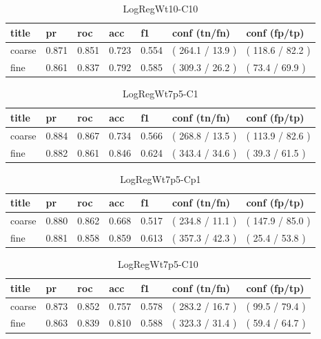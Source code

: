 \documentclass[ms]{nuthesis}
\begin{document}
\FloatBarrier
\begin{table}[H]
\centering
\begin{tabular}{|l||l||l||l||l||l||l|}\toprule
title & pr & roc & acc & f1 & conf (tn/fn) & conf (fp/tp) \\ \midrule
coarse & 0.871 & 0.851 & 0.723 & 0.554 & ( 264.1 / 13.9 ) & ( 118.6 / 82.2 ) \\
fine & 0.861 & 0.837 & 0.792 & 0.585 & ( 309.3 / 26.2 ) & ( 73.4 / 69.9 ) \\ \bottomrule
\end{tabular}
\caption{LogRegWt10-C10}
\label{tab:LogRegWt10-C10}
\end{table}
\FloatBarrier

\FloatBarrier
\begin{table}[H]
\centering
\begin{tabular}{|l||l||l||l||l||l||l|}\toprule
title & pr & roc & acc & f1 & conf (tn/fn) & conf (fp/tp) \\ \midrule
coarse & 0.884 & 0.867 & 0.734 & 0.566 & ( 268.8 / 13.5 ) & ( 113.9 / 82.6 ) \\
fine & 0.882 & 0.861 & 0.846 & 0.624 & ( 343.4 / 34.6 ) & ( 39.3 / 61.5 ) \\ \bottomrule
\end{tabular}
\caption{LogRegWt7p5-C1}
\label{tab:LogRegWt7p5-C1}
\end{table}
\FloatBarrier

\FloatBarrier
\begin{table}[H]
\centering
\begin{tabular}{|l||l||l||l||l||l||l|}\toprule
title & pr & roc & acc & f1 & conf (tn/fn) & conf (fp/tp) \\ \midrule
coarse & 0.880 & 0.862 & 0.668 & 0.517 & ( 234.8 / 11.1 ) & ( 147.9 / 85.0 ) \\
fine & 0.881 & 0.858 & 0.859 & 0.613 & ( 357.3 / 42.3 ) & ( 25.4 / 53.8 ) \\ \bottomrule
\end{tabular}
\caption{LogRegWt7p5-Cp1}
\label{tab:LogRegWt7p5-Cp1}
\end{table}
\FloatBarrier

\FloatBarrier
\begin{table}[H]
\centering
\begin{tabular}{|l||l||l||l||l||l||l|}\toprule
title & pr & roc & acc & f1 & conf (tn/fn) & conf (fp/tp) \\ \midrule
coarse & 0.873 & 0.852 & 0.757 & 0.578 & ( 283.2 / 16.7 ) & ( 99.5 / 79.4 ) \\
fine & 0.863 & 0.839 & 0.810 & 0.588 & ( 323.3 / 31.4 ) & ( 59.4 / 64.7 ) \\ \bottomrule
\end{tabular}
\caption{LogRegWt7p5-C10}
\label{tab:LogRegWt7p5-C10}
\end{table}
\FloatBarrier
\end{document}
